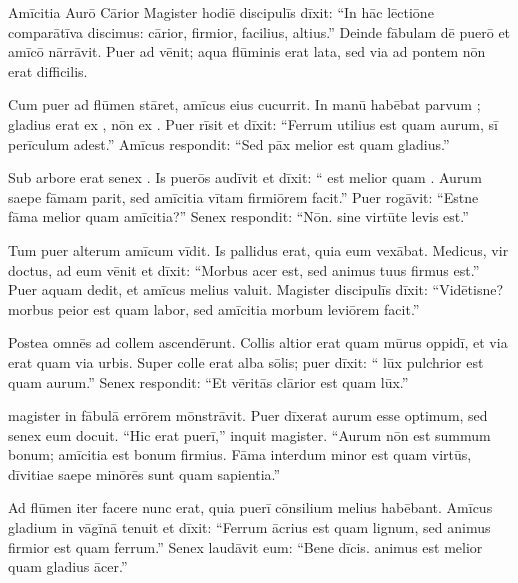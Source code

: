 \documentclass[12pt]{nextbook}
\begin{document}
\begin{readersection}{Amīcitia Aurō Cārior}
Magister hodiē discipulīs dīxit: “In hāc lēctiōne comparātīva discimus: cārior, firmior, facilius, altius.” Deinde fābulam dē puerō et amīcō nārrāvit. Puer  ad  vēnit; aqua flūminis erat lata, sed via ad pontem nōn erat difficilis.

Cum puer ad flūmen stāret, amīcus eius  cucurrit. In manū habēbat parvum ; gladius erat ex , nōn ex . Puer rīsit et dīxit: “Ferrum utilius est quam aurum, sī perīculum adest.” Amīcus respondit: “Sed pāx melior est quam gladius.”

Sub arbore erat senex . Is puerōs audīvit et dīxit: “ est melior quam . Aurum saepe fāmam parit, sed amīcitia vītam firmiōrem facit.” Puer rogāvit: “Estne fāma melior quam amīcitia?” Senex respondit: “Nōn.  sine virtūte levis est.”

Tum puer alterum amīcum vīdit. Is pallidus erat, quia  eum vexābat. Medicus, vir doctus, ad eum vēnit et dīxit: “Morbus acer est, sed animus tuus firmus est.” Puer aquam dedit, et amīcus melius valuit. Magister discipulīs dīxit: “Vidē\-tisne?  morbus peior est quam labor, sed amīcitia morbum leviōrem facit.”

Postea omnēs ad collem  ascendērunt. Collis altior erat quam mūrus oppidī, et via  erat quam via urbis. Super colle erat  alba sōlis; puer dīxit: “ lūx pulchrior est quam aurum.” Senex respondit: “Et vēritās clārior est quam lūx.”

 magister in fābulā errōrem mōnstrāvit. Puer dīxerat aurum esse optimum, sed senex eum docuit. “Hic erat  puerī,” inquit magister. “Aurum nōn est summum bonum; amīcitia est bonum firmius. Fāma interdum minor est quam virtūs, dīvitiae saepe minōrēs sunt quam sapientia.”

Ad flūmen iter facere nunc  erat, quia puerī cōnsilium melius habēbant. Amīcus gladium in vāgīnā tenuit et dīxit: “Ferrum ācrius est quam lignum, sed animus firmior est quam ferrum.” Senex laudāvit eum: “Bene dīcis.  animus est melior quam gladius ācer.”


\end{readersection}
\end{document}
